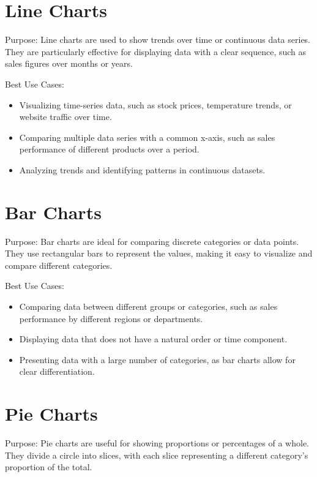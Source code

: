\documentclass[
]{book}
\providecommand{\tightlist}{%
  \setlength{\itemsep}{0pt}\setlength{\parskip}{0pt}}
\begin{document}
\hypertarget{line-charts}{%
\section{Line Charts}\label{line-charts}}

Purpose: Line charts are used to show trends over time or continuous data series. They are particularly effective for displaying data with a clear sequence, such as sales figures over months or years.

Best Use Cases:

\begin{itemize}
\tightlist
\item
  Visualizing time-series data, such as stock prices, temperature trends, or website traffic over time.
\item
  Comparing multiple data series with a common x-axis, such as sales performance of different products over a period.
\item
  Analyzing trends and identifying patterns in continuous datasets.
\end{itemize}

\hypertarget{bar-charts}{%
\section{Bar Charts}\label{bar-charts}}

Purpose: Bar charts are ideal for comparing discrete categories or data points. They use rectangular bars to represent the values, making it easy to visualize and compare different categories.

Best Use Cases:

\begin{itemize}
\tightlist
\item
  Comparing data between different groups or categories, such as sales performance by different regions or departments.
\item
  Displaying data that does not have a natural order or time component.
\item
  Presenting data with a large number of categories, as bar charts allow for clear differentiation.
\end{itemize}

\hypertarget{pie-charts}{%
\section{Pie Charts}\label{pie-charts}}

Purpose: Pie charts are useful for showing proportions or percentages of a whole. They divide a circle into slices, with each slice representing a different category's proportion of the total.
\end{document}
